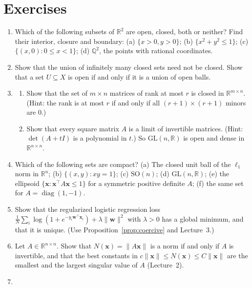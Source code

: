 \documentclass[11pt]{article}
\newcommand{\norm}[1]{\lVert #1 \rVert}
\theoremstyle{definition}
\theoremstyle{plain}
\theoremstyle{remark}
\DeclareMathOperator{\diag}{diag}
\begin{document}
\section*{Exercises}
\begin{enumerate}[leftmargin=*]
    \item Which of the following subsets of $\mathbb{R}^2$ are open, closed, both or neither? Find their interior, closure and boundary: (a) $\{x > 0, y > 0\}$; (b) $\{x^2 + y^2 \leq 1\}$; (c) $\{(x, 0) : 0 \leq x < 1\}$; (d) $\mathbb{Q}^2$, the points with rational coordinates.
    \item Show that the union of infinitely many closed sets need not be closed. Show that a set $U \subseteq X$ is open if and only if it is a union of open balls.
    \item \begin{enumerate}[label=(\alph*)]
        \item Show that the set of $m \times n$ matrices of rank at most $r$ is closed in $\mathbb{R}^{m \times n}$. (Hint: the rank is at most $r$ if and only if all $(r + 1) \times (r + 1)$ minors are $0$.)
        \item Show that every square matrix $A$ is a limit of invertible matrices. (Hint: $\det(A + tI)$ is a polynomial in $t$.) So $\mathrm{GL}(n, \mathbb{R})$ is open and dense in $\mathbb{R}^{n \times n}$.
    \end{enumerate}
    \item Which of the following sets are compact? (a) The closed unit ball of the $\ell_1$ norm in $\mathbb{R}^n$; (b) $\{(x, y) : xy = 1\}$; (c) $\mathrm{SO}(n)$; (d) $\mathrm{GL}(n, \mathbb{R})$; (e) the ellipsoid $\{\mathbf{x} : \mathbf{x}^\top A\mathbf{x} \leq 1\}$ for a symmetric positive definite $A$; (f) the same set for $A = \diag(1, -1)$.
    \item Show that the regularized logistic regression loss $\frac{1}{N}\sum_i \log(1 + e^{-y_i\mathbf{w}^\top\mathbf{x}_i}) + \lambda\norm{\mathbf{w}}^2$ with $\lambda > 0$ has a global minimum, and that it is unique. (Use Proposition~\ref{prop:coercive} and Lecture~3.)
    \item Let $A \in \mathbb{R}^{n \times n}$. Show that $N(\mathbf{x}) = \norm{A\mathbf{x}}$ is a norm if and only if $A$ is invertible, and that the best constants in $c\norm{\mathbf{x}} \leq N(\mathbf{x}) \leq C\norm{\mathbf{x}}$ are the smallest and the largest singular value of $A$ (Lecture~2).
    \item \begin{enumerate}[label=(\alph*)]

\end{enumerate}
\end{enumerate}
\end{document}
